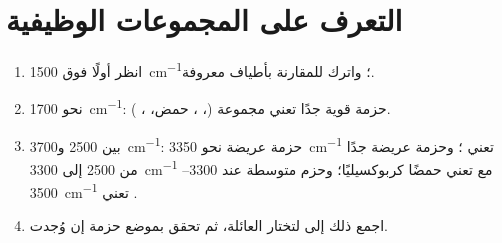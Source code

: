 \section{التعرف على المجموعات الوظيفية}


\begin{method}\label{met:g11:infrared:reading}
\begin{enumerate}
  \item انظر أولًا فوق \qty{1500}{cm^{-1}}؛ واترك 
        للمقارنة بأطياف معروفة.
  \item نحو \qty{1700}{cm^{-1}}: حزمة قوية جدًا تعني مجموعة 
        (، ، حمض، ، ).
  \item بين 2500 و\qty{3700}{cm^{-1}}: حزمة عريضة نحو
        \qty{3350}{cm^{-1}} تعني  ؛ وحزمة عريضة جدًا
        من 2500 إلى \qty{3300}{cm^{-1}} مع  تعني
        حمضًا كربوكسيليًا؛ وحزم متوسطة عند 3300--\qty{3500}{cm^{-1}} تعني
        .
  \item اجمع ذلك إلى  لتختار العائلة، ثم
        تحقق بموضع حزمة  إن وُجدت.
\end{enumerate}
\end{method}

